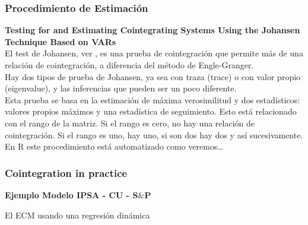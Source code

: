 \documentclass[spanish,xcolor=table]{beamer}
\begin{document}

\begin{frame}
\frametitle{Procedimiento de Estimaci\'on}

\textbf{Testing for and Estimating Cointegrating Systems Using the Johansen Technique Based on VARs}\\
\vspace{4mm}	
El test de Johansen, ver \cite{johansen1988statistical},  es una prueba de cointegraci\'on que permite m\'as de una relaci\'on de cointegraci\'on, a diferencia del m\'etodo de Engle-Granger.\\
\vspace{4mm}	
Hay dos tipos de prueba de Johansen, ya sea con traza (trace) o con valor propio (eigenvalue), y las inferencias que pueden ser un poco diferente.\\
\vspace{4mm}	
Esta prueba se basa en la estimaci\'on de m\'axima verosimilitud y dos estad\'{i}sticos: valores propios m\'aximos y una estad\'{i}stica de seguimiento. Esto est\'a relacionado con el rango de la matriz. Si el rango es cero, no hay una relaci\'on de cointegraci\'on. Si el rango es uno, hay uno, si son dos hay dos y as\'{i} sucesivamente.\\
\vspace{4mm}	
En R este procedimiento est\'a automatizado como veremos…

\end{frame}

\begin{frame}
\frametitle{Cointegration in practice}
\textbf{Ejemplo Modelo IPSA - CU - S$\&$P}

El ECM usando una regresi\'on din\'amica\\
\vspace{4mm}	


\end{frame}
\end{document}
